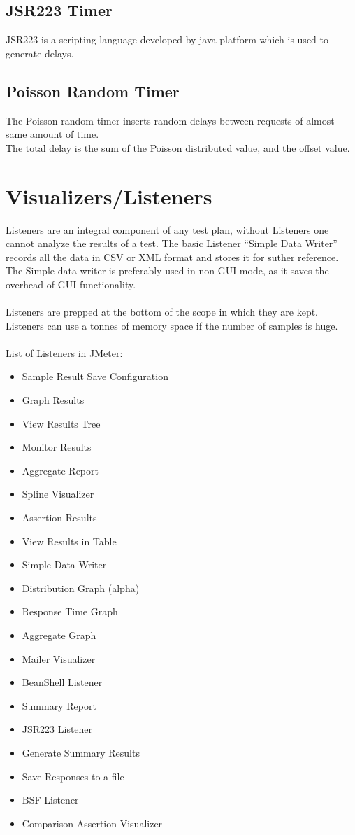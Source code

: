 \documentclass[12pt]{book}
\begin{document}
  \subsection{JSR223 Timer}
  JSR223 is a scripting language developed by java platform which is used to generate delays.
  
  \subsection{Poisson Random Timer}
  The Poisson random timer inserts random delays between requests of almost same amount of time.\\
  The total delay is the sum of the Poisson distributed value, and the offset value.
  
\section{Visualizers/Listeners}

  Listeners are an integral component of any test plan, without Listeners one cannot analyze the results of a test. 
  The basic Listener “Simple Data Writer” records all the data in CSV or XML format and stores it for suther reference. 
  The Simple data writer is preferably used in non-GUI mode, as it saves the overhead of GUI functionality. \\
  \\
  Listeners are prepped at the bottom of the scope in which they are kept.\\
  Listeners can use a tonnes of memory space if the number of samples is huge.\cite{Ehh} \cite{Jmeter} \\
  \\
  List of Listeners in JMeter:
  \begin{itemize}
   \item Sample Result Save Configuration
   \item Graph Results
   \item View Results Tree
   \item Monitor Results
   \item Aggregate Report
   \item Spline Visualizer
   \item Assertion Results
   \item View Results in Table
   \item Simple Data Writer
   \item Distribution Graph (alpha)
   \item Response Time Graph
   \item Aggregate Graph
   \item Mailer Visualizer
   \item BeanShell Listener
   \item Summary Report
   \item JSR223 Listener
   \item Generate Summary Results
   \item Save Responses to a file
   \item BSF Listener
   \item Comparison Assertion Visualizer
  \end{itemize}
 
\end{document}

